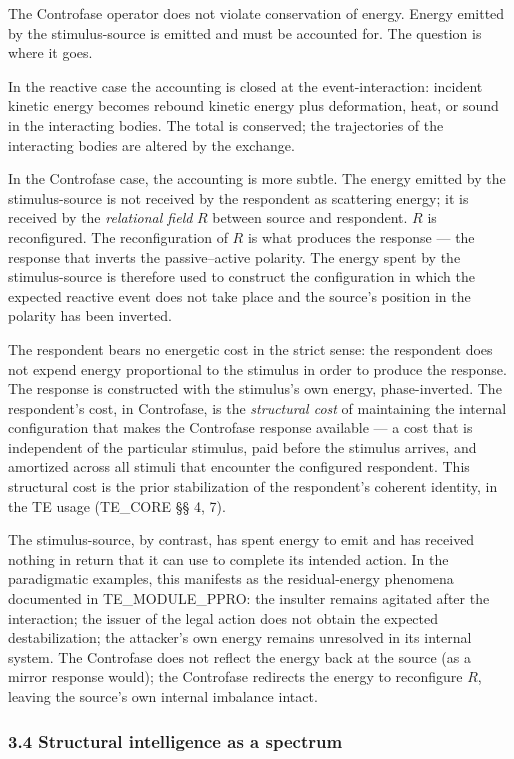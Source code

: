 \documentclass[
  11pt,
  a4paper,
]{article}
\begin{document}
The Controfase operator does not violate conservation of energy. Energy
emitted by the stimulus-source is emitted and must be accounted for. The
question is where it goes.

In the reactive case the accounting is closed at the event-interaction:
incident kinetic energy becomes rebound kinetic energy plus deformation,
heat, or sound in the interacting bodies. The total is conserved; the
trajectories of the interacting bodies are altered by the exchange.

In the Controfase case, the accounting is more subtle. The energy
emitted by the stimulus-source is not received by the respondent as
scattering energy; it is received by the \emph{relational field} \(R\)
between source and respondent. \(R\) is reconfigured. The
reconfiguration of \(R\) is what produces the response --- the response
that inverts the passive--active polarity. The energy spent by the
stimulus-source is therefore used to construct the configuration in
which the expected reactive event does not take place and the source's
position in the polarity has been inverted.

The respondent bears no energetic cost in the strict sense: the
respondent does not expend energy proportional to the stimulus in order
to produce the response. The response is constructed with the stimulus's
own energy, phase-inverted. The respondent's cost, in Controfase, is the
\emph{structural cost} of maintaining the internal configuration that
makes the Controfase response available --- a cost that is independent
of the particular stimulus, paid before the stimulus arrives, and
amortized across all stimuli that encounter the configured respondent.
This structural cost is the prior stabilization of the respondent's
coherent identity, in the TE usage (TE\_CORE §§ 4, 7).

The stimulus-source, by contrast, has spent energy to emit and has
received nothing in return that it can use to complete its intended
action. In the paradigmatic examples, this manifests as the
residual-energy phenomena documented in TE\_MODULE\_PPRO: the insulter
remains agitated after the interaction; the issuer of the legal action
does not obtain the expected destabilization; the attacker's own energy
remains unresolved in its internal system. The Controfase does not
reflect the energy back at the source (as a mirror response would); the
Controfase redirects the energy to reconfigure \(R\), leaving the
source's own internal imbalance intact.

\subsubsection{3.4 Structural intelligence as a
spectrum}\label{structural-intelligence-as-a-spectrum}
\end{document}
